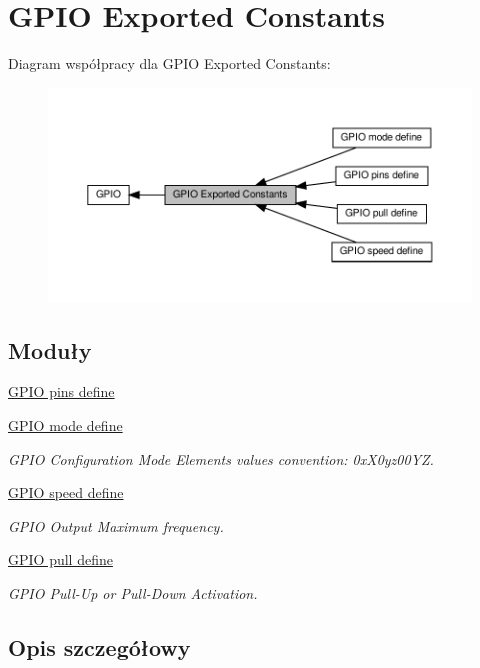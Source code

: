 \hypertarget{group___g_p_i_o___exported___constants}{}\section{G\+P\+IO Exported Constants}
\label{group___g_p_i_o___exported___constants}
Diagram współpracy dla G\+P\+IO Exported Constants\+:\nopagebreak
\begin{figure}[H]
\begin{center}
\leavevmode
\includegraphics[width=350pt]{group___g_p_i_o___exported___constants}
\end{center}
\end{figure}
\subsection*{Moduły}
\begin{DoxyCompactItemize}
\item 
\hyperlink{group___g_p_i_o__pins__define}{G\+P\+I\+O pins define}
\item 
\hyperlink{group___g_p_i_o__mode__define}{G\+P\+I\+O mode define}
\begin{DoxyCompactList}\small\item\em G\+P\+IO Configuration Mode Elements values convention\+: 0x\+X0yz00\+YZ. \end{DoxyCompactList}\item 
\hyperlink{group___g_p_i_o__speed__define}{G\+P\+I\+O speed define}
\begin{DoxyCompactList}\small\item\em G\+P\+IO Output Maximum frequency. \end{DoxyCompactList}\item 
\hyperlink{group___g_p_i_o__pull__define}{G\+P\+I\+O pull define}
\begin{DoxyCompactList}\small\item\em G\+P\+IO Pull-\/\+Up or Pull-\/\+Down Activation. \end{DoxyCompactList}\end{DoxyCompactItemize}


\subsection{Opis szczegółowy}
